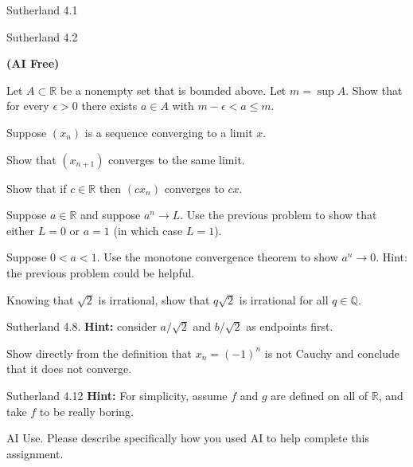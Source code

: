 \documentclass[minion]{homework}
\newcommand{\Reals}{\ensuremath{\mathbb R}}%
\newcommand{\Rats}{\ensuremath{\mathbb Q}} %
\begin{document}
\begin{problems}
\problem Sutherland 4.1

\problem Sutherland 4.2

\problem \textbf{(AI Free)}

Let $A\subset \Reals$ be a nonempty set that is bounded above.
Let $m=\sup A$.  Show that for every $\epsilon>0$ there exists $a\in A$
with $m-\epsilon < a \le m$.

\problem Suppose $(x_n)$ is a sequence converging to a limit $x$.
\begin{subproblems}
\item Show that $(x_{n+1})$ converges to the same limit.
\item Show that if $c\in\Reals$ then $(cx_{n})$ converges to $c x$.
\end{subproblems}

\problem Suppose $a\in\Reals$ and suppose $a^n\to L$. 
Use the previous problem to show that either $L=0$ or 
$a=1$ (in which case $L=1$).

\problem Suppose $0<a<1$.  Use the monotone convergence theorem 
to show $a^n\to 0$. Hint: the previous
problem could be helpful.

\problem 
\begin{subproblems}
\item Knowing that $\sqrt{2}$ is irrational, show that $q\sqrt{2}$ 
is irrational for all $q\in \Rats$.
\item  Sutherland 4.8. \textbf{Hint:} consider $a/\sqrt{2}$ and $b/\sqrt{2}$ as endpoints first.
\end{subproblems}
 
\problem Show directly from the definition that $x_n = (-1)^n$ is not 
Cauchy and conclude that it does not converge.

\problem Sutherland 4.12 \textbf{Hint:} For simplicity, 
assume $f$ and $g$ are defined on all of $\Reals$, and take $f$ 
to be really boring.

\problem AI Use. Please describe specifically how you used AI to help complete this assignment.

\end{problems}
\end{document}
